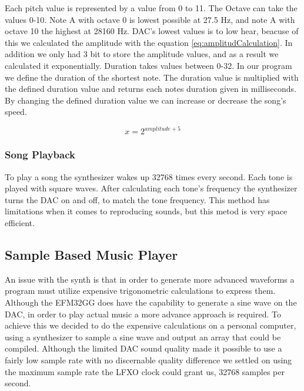 Each pitch value is represented by a value from 0 to 11. The Octave can take the values 0-10. Note A with octave 0 is lowest possible at 27.5 Hz, and note A with octave 10 the highest at 28160 Hz. DAC's lowest values is to low hear, beacuse of this we calculated the amplitude with the equation \ref{eq:amplitudCalculation}. In addition we only had 3 bit to store the amplitude values, and as a result we calculated it exponentially. Duration takes values between 0-32. In our program we define the duration of the shortest note. The duration value is multiplied with the defined duration value and returns each notes duration given in milliseconds. By changing the defined duration value we can increase or decrease the song's speed.

\begin{equation}
  x = 2^{amplitude + 5}
  \label{eq:amplitudCalculation}
\end{equation}

\subsubsection{Song Playback}
To play a song the synthesizer wakes up 32768 times every second. Each tone is played with square waves. After calculating each tone's frequency the synthesizer turns the DAC on and off, to match the tone frequency. This method has limitations when it comes to reproducing sounds, but this metod is very space efficient.


\subsection{Sample Based Music Player}\label{sec:sample-based-music-player}
An issue with the synth is that in order to generate more advanced waveforms a program must utilize expensive trigonometric calculations to express them. Although the EFM32GG does have the capability to generate a sine wave on the DAC, in order to play actual music a more advance approach is required. To achieve this we decided to do the expensive calculations on a personal computer, using a synthesizer to sample a sine wave and output an array that could be compiled. Although the limited DAC sound quality made it possible to use a fairly low sample rate with no discernable quality difference we settled on using the maximum sample rate the LFXO clock could grant us, 32768 samples per second. 

